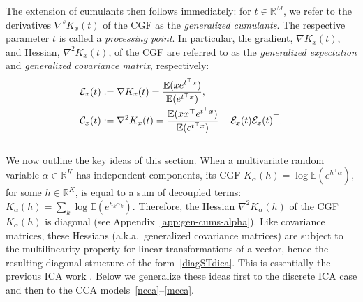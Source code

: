 \documentclass{article}
\newcommand{\R}{\mathbb{R}}
\newcommand{\ebb}{\mathbb{E}}
\newcommand{\ccal}{\mathcal{C}}
\newcommand{\ecal}{\mathcal{E}}
\begin{document}
The extension of cumulants then follows immediately: for $t\in\R^M$, we refer to the derivatives $\nabla^sK_x(t)$ of the CGF as the \emph{generalized cumulants}. The respective parameter $t$ is called a \emph{processing point}. In particular, the gradient, $\nabla K_x(t)$, and Hessian, $\nabla^2 K_x(t)$, of the CGF are referred to as the \emph{generalized expectation} and \emph{generalized covariance matrix}, respectively:
\\[-1.3em]
\begin{align}
\textstyle
\label{gen-expectation}
\textstyle
\ecal_x(t) &:= \nabla K_x(t) = \frac{\ebb ({ x e^{t^{\top}x}})}{\ebb ( e^{t^{\top}x} ) }, \\[-0.1em]
\textstyle
\label{gen-covariance}
\ccal_x(t) &:= \nabla^2 K_x(t) = \frac{\ebb (xx^{\top} e^{t^{\top}x}) }{\ebb ( e^{t^{\top}x} ) } - \ecal_x(t) \ecal_x(t)^{\top}.
\end{align}
\\[-1.3em] 
We now outline the key ideas of this section. When a multivariate random variable $\alpha\in\R^K$ has independent components, its CGF $K_{\alpha}(h)=\log { \ebb(e^{h^{\top}\alpha}) }$, for some $h\in\R^K$, is equal to a sum of decoupled terms:
$
K_{\alpha}(h) = \sum_k \log \ebb(e^{h_k\alpha_k}).
$
Therefore, the Hessian $\nabla^2K_{\alpha}(h)$ of the CGF $K_{\alpha}(h)$ is diagonal (see Appendix~\ref{app:gen-cums-alpha}). Like   covariance matrices, these Hessians (a.k.a.~generalized covariance matrices) are subject to the multilinearity property for linear transformations of a vector, hence the resulting diagonal structure of the form~\eqref{diagSTdica}. This is essentially the previous ICA work \citep{Yer2000,TodHer2013}.
Below we generalize these ideas first to the discrete ICA case and then to the CCA models~\eqref{ncca}--\eqref{mcca}.
\end{document}
